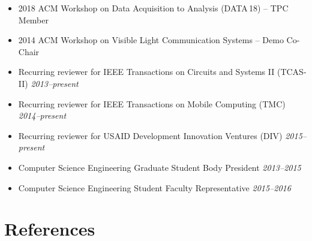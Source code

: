 \documentclass{article}
\begin{document}
\begin{itemize}

  \item[] 2018 ACM Workshop on Data Acquisition to Analysis (DATA\,18) -- TPC Member
  \item[] 2014 ACM Workshop on Visible Light Communication Systems -- Demo Co-Chair
  \item[] Recurring reviewer for IEEE Transactions on Circuits and Systems II (TCAS-II)
    \emph{2013--present}
  \item[] Recurring reviewer for IEEE Transactions on Mobile Computing (TMC)
    \emph{2014--present}
  \item[] Recurring reviewer for USAID Development Innovation Ventures (DIV)
    \emph{2015--present}
  \item[] Computer Science Engineering Graduate Student Body President
    \emph{2013--2015}
  \item[] Computer Science Engineering Student Faculty Representative
    \emph{2015--2016}

\end{itemize}



\section*{References}
\end{document}
